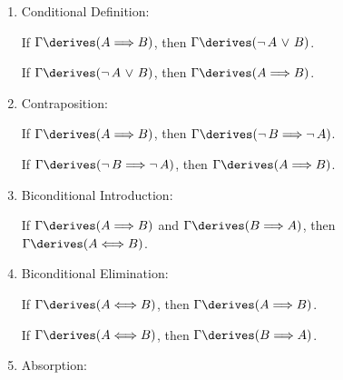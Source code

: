 \begin{enumerate}[topsep=2pt,itemsep=10pt,label=\textup{\texttt{(\arabic*)}}]
        If \( \Gamma \derives \mleft( A \,\,{\lor}\,\, B \mright) \), then
        \( \Gamma \derives \mleft( \lnot \, \mleft( \lnot \, A \,\,{\land}\,\, \lnot \, B \mright) \mright) \).

        \noindent
        If \( \Gamma \derives \mleft( \lnot \, \mleft( \lnot \, A \,\,{\land}\,\, \lnot \, B \mright) \mright) \),
        then \( \Gamma \derives \mleft( A \,\,{\lor}\,\, B \mright) \).

    \item Conditional Definition:  \label{rule-of-inference:conditional-definition}

        If \( \Gamma \derives \mleft( A {\implies} B \mright) \), then \( \Gamma \derives \mleft( \lnot \, A \,\,{\lor}\,\, B \mright) \).

        \noindent
        If \( \Gamma \derives \mleft( \lnot \, A \,\,{\lor}\,\, B \mright) \), then \( \Gamma \derives \mleft( A {\implies} B \mright) \).

    \item Contraposition:  \label{rule-of-inference:contraposition}

        If \( \Gamma \derives \mleft( A {\implies} B \mright) \), then \( \Gamma \derives \mleft( \lnot \, B {\implies} \lnot \, A \mright) \).

        \noindent
        If \( \Gamma \derives \mleft( \lnot \, B {\implies} \lnot \, A \mright) \), then \( \Gamma \derives \mleft( A {\implies} B \mright) \).

    \item Biconditional Introduction:  \label{rule-of-inference:biconditional-introduction}

        If \( \Gamma \derives \mleft( A {\implies} B \mright) \) and \( \Gamma \derives \mleft( B {\implies} A \mright) \),
        then \( \Gamma \derives \mleft( A {\iff} B \mright) \).

    \item Biconditional Elimination:  \label{rule-of-inference:biconditional-elimination}

        If \( \Gamma \derives \mleft( A {\iff} B \mright) \), then \( \Gamma \derives \mleft( A {\implies} B \mright) \).

        \noindent
        If \( \Gamma \derives \mleft( A {\iff} B \mright) \), then \( \Gamma \derives \mleft( B {\implies} A \mright) \).

    \item Absorption:  \label{rule-of-inference:absorption}


\end{enumerate}
